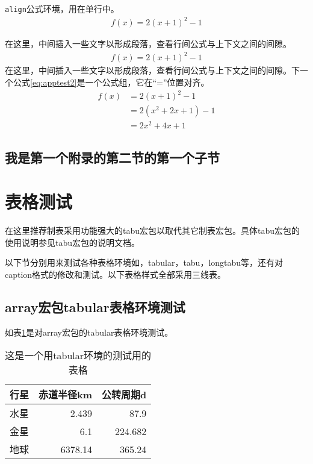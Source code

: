 \texttt{align}公式环境，用在单行中。
\begin{align}\label{eq:apptest1}
	f(x) = 2(x + 1)^{2} - 1
\end{align}

在这里，中间插入一些文字以形成段落，查看行间公式与上下文之间的间隙。
\begin{align*}
	f(x) = 2(x + 1)^{2} - 1
\end{align*}
在这里，中间插入一些文字以形成段落，查看行间公式与上下文之间的间隙。下一个公式\eqref{eq:apptest2}是一个公式组，它在“=”位置对齐。
\begin{align}\label{eq:apptest2}
	f(x) & = 2(x + 1)^{2} - 1\\
		 & = 2(x^{2} + 2x +1)-1\\
		 & = 2x^{2} + 4x + 1
\end{align}

\subsection{我是第一个附录的第二节的第一个子节}

\section{表格测试}
在这里推荐制表采用功能强大的tabu宏包以取代其它制表宏包。具体tabu宏包的使用说明参见tabu宏包的说明文档。

以下节分别用来测试各种表格环境如，tabular，tabu，longtabu等，还有对caption格式的修改和测试。以下表格样式全部采用三线表。

\subsection{array宏包tabular表格环境测试}
如表\ref{tab:appfirst_table_test}是对array宏包的tabular表格环境测试。
\begin{table}[htbp]
	\centering
	\caption{这是一个用tabular环境的测试用的表格}\label{tab:appfirst_table_test}
    \begin{tabular}{lrr}
    \toprule
    \textbf{行星}     & \textbf{赤道半径}km & \textbf{公转周期}d \\
    \midrule
    水星     & 2.439  & 87.9 \\
    金星     & 6.1    & 224.682 \\
    地球     & 6378.14 & 365.24 \\
    \bottomrule
    \end{tabular}%
\end{table}

